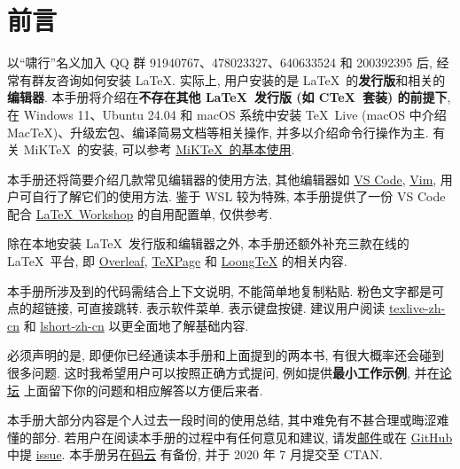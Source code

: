 
\chapter*{前言}

以``啸行''名义加入 QQ 群 91940767、478023327、640633524 和 200392395 后,
经常有群友咨询如何安装 \LaTeX.
实际上,
用户安装的是 \LaTeX\ 的\textbf{发行版}和相关的\textbf{编辑器}.
本手册将介绍在\textbf{不存在其他 \LaTeX\ 发行版 (如 C\TeX\ 套装) 的前提下},
在 Windows 11、Ubuntu 24.04 和 macOS 系统中安装
\TeX~Live (macOS 中介绍 Mac\TeX)、升级宏包、编译简易文档等相关操作,
并多以介绍命令行操作为主.
有关 MiK\TeX\ 的安装,
可以参考 \href{https://camusecao.top/2021-06-16/MiKTeX/}{MiK\TeX\ 的基本使用}.

本手册还将简要介绍几款常见编辑器的使用方法,
其他编辑器如 \href{https://code.visualstudio.com/}{VS Code},
\href{https://www.vim.org/}{Vim},
用户可自行了解它们的使用方法.
鉴于 WSL 较为特殊,
本手册提供了一份 VS Code 配合
\href{https://marketplace.visualstudio.com/items?itemName=James-Yu.latex-workshop}{\LaTeX\ Workshop}
的自用配置单,
仅供参考.

除在本地安装 \LaTeX\ 发行版和编辑器之外,
本手册还额外补充三款在线的 \LaTeX\ 平台,
即 \href{http://www.overleaf.com}{Overleaf},
\href{https://www.texpage.com/}{TeXPage} 和
\href{https://www.loongtex.com/}{LoongTeX} 的相关内容.

本手册所涉及到的代码需结合上下文说明, 不能简单地复制粘贴.
粉色文字都是可点的超链接, 可直接跳转.
 表示软件菜单.  表示键盘按键.
建议用户阅读 \href{https://tug.org/texlive/doc/texlive-zh-cn/texlive-zh-cn.pdf}{\textsf{texlive-zh-cn}}
和 \href{http://mirrors.ctan.org/info/lshort/chinese/lshort-zh-cn.pdf}{\textsf{lshort-zh-cn}}
以更全面地了解基础内容.

必须声明的是,
即便你已经通读本手册和上面提到的两本书,
有很大概率还会碰到很多问题.
这时我希望用户可以按照正确方式提问,
例如提供\textbf{最小工作示例},
并在\href{https://ask.latexstudio.net}{论坛}%
上面留下你的问题和相应解答以方便后来者.

本手册大部分内容是个人过去一段时间的使用总结, 其中难免有不甚合理或晦涩难懂的部分.
若用户在阅读本手册的过程中有任何意见和建议,
请发\href{mailto:ranwang.osbert@outlook.com}{邮件}或在
\href{https://github.com/OsbertWang/install-latex-guide-zh-cn}{GitHub} 中提
\href{https://github.com/OsbertWang/install-latex-guide-zh-cn/issues}{issue}.
本手册另在\href{https://gitee.com/OsbertWang/install-latex-guide-zh-cn}{码云}%
有备份,
并于 2020 年 7 月提交至 CTAN.

